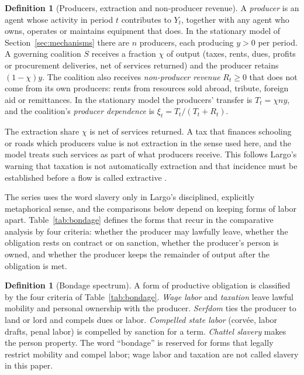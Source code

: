 \documentclass[11pt,letterpaper]{article}
\theoremstyle{definition}
\newtheorem{definition}[theorem]{Definition}
\theoremstyle{remark}
\begin{document}
\begin{definition}[Producers, extraction and non-producer revenue]
\label{def:productive-power:surplus}
A \emph{producer} is an agent whose activity in period $t$ contributes to $Y_t$, together with any agent who owns, operates or maintains equipment that does. In the stationary model of Section~\ref{sec:mechanisms} there are $n$ producers, each producing $y>0$ per period. A governing coalition $S$ receives a fraction $\chi$ of output (taxes, rents, dues, profits or procurement deliveries, net of services returned) and the producer retains $(1-\chi)y$. The coalition also receives \emph{non-producer revenue} $R_t\ge 0$ that does not come from its own producers: rents from resources sold abroad, tribute, foreign aid or remittances. In the stationary model the producers' transfer is $T_t=\chi ny$, and the coalition's \emph{producer dependence} is $\xi_t=T_t/(T_t+R_t)$.
\end{definition}

The extraction share $\chi$ is net of services returned. A tax that finances schooling or roads which producers value is not extraction in the sense used here, and the model treats such services as part of what producers receive. This follows Largo's warning that taxation is not automatically extraction and that incidence must be established before a flow is called extractive \citep{largo2026hbs}.

The series uses the word slavery only in Largo's disciplined, explicitly metaphorical sense, and the comparisons below depend on keeping forms of labor apart. Table~\ref{tab:bondage} defines the forms that recur in the comparative analysis by four criteria: whether the producer may lawfully leave, whether the obligation rests on contract or on sanction, whether the producer's person is owned, and whether the producer keeps the remainder of output after the obligation is met.

\begin{definition}[Bondage spectrum]
\label{def:productive-power:bondage}
A form of productive obligation is classified by the four criteria of Table~\ref{tab:bondage}. \emph{Wage labor} and \emph{taxation} leave lawful mobility and personal ownership with the producer. \emph{Serfdom} ties the producer to land or lord and compels dues or labor. \emph{Compelled state labor} (corv\'ee, labor drafts, penal labor) is compelled by sanction for a term. \emph{Chattel slavery} makes the person property. The word ``bondage'' is reserved for forms that legally restrict mobility and compel labor; wage labor and taxation are not called slavery in this paper.
\end{definition}
\end{document}
